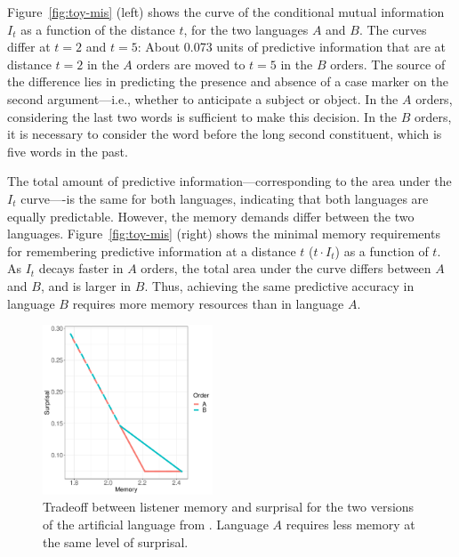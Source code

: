 Figure~\ref{fig:toy-mis} (left) shows the curve of the conditional mutual information $I_t$ as a function of the distance $t$, for the two languages $A$ and $B$. 
The curves differ at $t=2$ and $t=5$: 
About 0.073 units of predictive information that are at distance $t=2$ in the $A$ orders are moved to $t=5$ in the $B$ orders.
The source of the difference lies in predicting the presence and absence of a case marker on the second argument---i.e., whether to anticipate a subject or object.
In the $A$ orders, considering the last two words is sufficient to make this decision.
In the $B$ orders, it is necessary to consider the word before the long second constituent, which is five words in the past.

The total amount of predictive information---corresponding to the area under the $I_t$ curve----is the same for both languages, indicating that both languages are equally predictable. However, the memory demands differ between the two languages. Figure~\ref{fig:toy-mis} (right) shows the minimal memory requirements for remembering predictive information at a distance $t$ ($t\cdot I_t$) as a function of $t$. As $I_t$ decays faster in $A$ orders, the total area under the curve differs between $A$ and $B$, and is larger in $B$. Thus, achieving the same predictive accuracy in language $B$ requires more memory resources than in language $A$.


\begin{figure}
\centering
\includegraphics[width=0.45\textwidth]{figures/toy-mem-surp.pdf}
	\caption{Tradeoff between listener memory and surprisal for the two versions of the artificial language from \cite{fedzechkina-human-2017}. Language $A$ requires less memory at the same level of surprisal. }
	\label{fig:toy-listener-tradeoff}
\end{figure}

